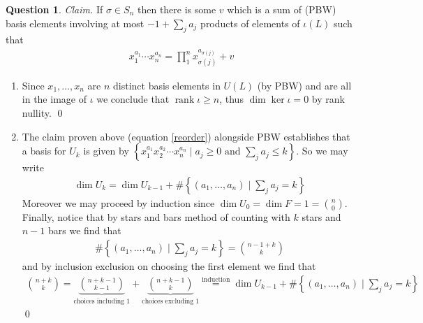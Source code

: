\documentclass[10.5pt]{article}
\theoremstyle{definition}
\newtheorem{pb}{Question}
\numberwithin{example}{subsection}
\numberwithin{proposition}{subsection}
\newcommand{\set}[1]{\left\{#1\right\}}
\newcommand{\tand}{\text{ and }}
\begin{document}
\begin{pb}
        \emph{Claim.} If \(\sigma \in S_n\) then there is some \(v\) which is a sum of (PBW) basis elements involving at most \(-1 + \sum_j a_j\) products of elements of \(\iota(L)\) such that
        \begin{align}
            x_1^{a_1}\cdots x_n^{a_n} = \prod_1^n x_{\sigma(j)}^{a_{\sigma(j)}} + v \label{reorder}
        \end{align}

        \begin{enumerate}
            \item Since \(x_1,\hdots,x_n\) are \(n\) distinct basis elements in \(U(L)\) (by PBW) and are all in the image of \(\iota\) we conclude that \(\operatorname{rank}\iota \geq n\), thus \(\dim \ker \iota = 0\) by rank nullity. \qed
            \item The claim proven above (equation \eqref{reorder}) alongside PBW establishes that a basis for \(U_k\) is given by \(\set{x_1^{a_1}x_2^{a_2}\cdots x_n^{a_n} \mid a_j \geq 0 \tand \sum_j a_j \leq k}\). So we may write
            \begin{align}
                \dim U_k = \dim U_{k-1} + \# \set{(a_1,\hdots,a_n)\mid \sum_j a_j = k}
            \end{align}
            Moreover we may proceed by induction since \(\dim U_0 = \dim F = 1 = \binom{n}{0}\). Finally, notice that by stars and bars method of counting with \(k\) stars and \(n-1\) bars we find that
            \begin{align}
                \# \set{(a_1,\hdots,a_n)\mid \sum_j a_j = k} = \binom{n-1+k}{k}
            \end{align}
            and by inclusion exclusion on choosing the first element we find that
            \begin{align}
                \binom{n+k}{k} = \underbrace{\binom{n+k-1}{k-1}}_{\text{choices including } 1} + \underbrace{\binom{n+k-1}{k}}_{\text{choices excluding } 1} \overset{\text{induction}}{=} \dim U_{k-1} + \# \set{(a_1,\hdots,a_n)\mid \sum_j a_j = k}
            \end{align} \qed


\end{enumerate}
\end{pb}
\end{document}
